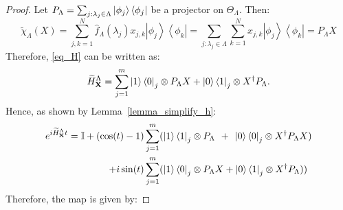 \documentclass[10pt]{amsart}
\newcommand{\X}{\textbf{X}}
\newcommand{\dmat}[1]{{| #1 \rangle \langle #1 |}}
\newcommand{\dm}[2]{\left|#1\right\rangle\left\langle#2\right|}
\begin{document}
\begin{proof}
 Let $P_{\Lambda} = \sum_{j: \lambda_j \in \Lambda} \ket{\phi_j}\bra{\phi_j}$ be a projector on $\Theta_\Lambda$. Then:
    \begin{equation}
        \widetilde{\chi}_{\Lambda} (X) =\sum_{j,k=1}^{N} \hat{f}_{\Lambda}({\lambda_j})x_{j,k} \dm{\phi_j}{\phi_k} = \sum_{j: \lambda_j \in \Lambda}\sum_{k=1}^{N} x_{j,k} \dm{\phi_j}{\phi_k} = P_{\Lambda} X
    \end{equation}
Therefore, \eqref{eq_H} can be written as:
    \begin{equation}
        \widetilde{H}^{\Lambda}_{\X} =  \sum_{j=1}^m \ket{1}\bra{0}_j \otimes P_{\Lambda}X + \ket{0}\bra{1}_j \otimes X^{\dagger} P_{\Lambda}.
    \end{equation}
Hence, as shown by Lemma~\ref{lemma_simplify_h}:
\begin{align}
\begin{split}
    e^{i\widetilde{H}^{\Lambda}_{\X}t} = \mathbb{I} +  (\cos(t) -1) & \sum_{j=1}^m (\ket{1}\bra{1}_j\otimes P_{\Lambda} \hspace{0.425em} + \hspace{0.425em}\ket{0}\bra{0}_j\otimes X^{\dagger}P_{\Lambda} X) \\ +  i\sin(t) & \sum_{j=1}^m(\ket{1}\bra{0}_j \otimes P_{\Lambda} X + \ket{0}\bra{1}_j \otimes  X^{\dagger}P_{\Lambda}))
    \end{split}
\end{align}
Therefore, the map is given by:

\end{proof}
\end{document}
